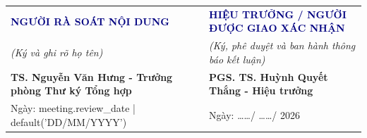 \documentclass[11pt,a4paper]{article}
\begin{document}
\vspace{25pt}

\noindent
\begin{tabularx}{\textwidth}{@{}>{\centering\arraybackslash}X >{\centering\arraybackslash}X@{}}
  \textbf{\textcolor{navy}{NGƯỜI RÀ SOÁT NỘI DUNG}} & \textbf{\textcolor{navy}{HIỆU TRƯỞNG / NGƯỜI ĐƯỢC GIAO XÁC NHẬN}} \\
  \textit{(Ký và ghi rõ họ tên)} & \textit{(Ký, phê duyệt và ban hành thông báo kết luận)} \\[50pt]
  \textbf{ TS. Nguyễn Văn Hưng - Trưởng phòng Thư ký Tổng hợp } & \textbf{ PGS. TS. Huỳnh Quyết Thắng - Hiệu trưởng } \\
  Ngày: {{ meeting.review_date | default('DD/MM/YYYY') }} & Ngày: \ldots\ldots / \ldots\ldots / 2026 \\
\end{tabularx}
\end{document}
